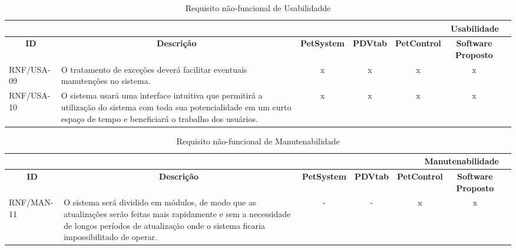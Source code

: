 \documentclass[12pt,openright,twoside,a4paper,english,french,spanish,brazil]{abntex2}
\begin{document}
\begin{landscape}
\begin{table}[!htpb]
\centering
\caption{Requisito não-funcional de Usabilidadde}\label{tab:RNF_USA}
\begin{small} 
\setlength{\tabcolsep}{3pt}
\begin{tabular}{|p{3cm}|p{}|c|c|c|cc|}
\toprule
    \multicolumn{6}{r}{\textbf{Usabilidade}} \\
    \midrule
    \multicolumn{1}{c}{\textbf{ID}} & \multicolumn{1}{c}{\textbf{Descrição}} & \multicolumn{1}{c}{\textbf{PetSystem}} & \multicolumn{1}{c}{\textbf{PDVtab}} & \multicolumn{1}{c}{\textbf{PetControl}} & \multicolumn{1}{c}{\textbf{Software Proposto}} \\
    RNF/USA-09 & O tratamento de exceções deverá facilitar eventuais manutenções no sistema. & x & x & x & x \\
    RNF/USA-10 & O sistema usará uma interface intuitiva que permitirá a utilização do sistema com toda sua potencialidade em um curto espaço de tempo e beneficiará o trabalho dos usuários. & x & x & x & x \\
    \bottomrule
\end{tabular}%
\end{small}
\end{table}
\begin{table}[!htpb]
\centering
\caption{Requisito não-funcional de Manutenabilidade}\label{tab:RNF_MAN}
\begin{small} 
\setlength{\tabcolsep}{3pt}
\begin{tabular}{|p{3cm}|p{}|c|c|c|cc|}
\toprule
    \multicolumn{6}{r}{\textbf{Manutenabilidade}} \\
    \midrule
    \multicolumn{1}{c}{\textbf{ID}} & \multicolumn{1}{c}{\textbf{Descrição}} & \multicolumn{1}{c}{\textbf{PetSystem}} & \multicolumn{1}{c}{\textbf{PDVtab}} & \multicolumn{1}{c}{\textbf{PetControl}} & \multicolumn{1}{c}{\textbf{Software Proposto}} \\
    RNF/MAN-11 & O sistema será dividido em módulos, de modo que as atualizações serão feitas mais rapidamente e sem a necessidade de longos períodos de atualização onde o sistema ficaria impossibilitado de operar. & - & - & x & x \\

\end{tabular}
\end{small}
\end{table}
\end{landscape}
\end{document}

